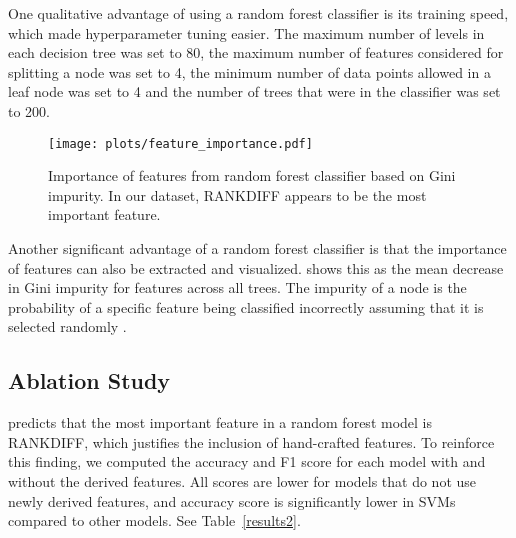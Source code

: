 
One qualitative advantage of using a random forest classifier is its training speed, which made hyperparameter tuning easier. The maximum number of levels in each decision tree was set to 80, the maximum number of features considered for splitting a node was set to 4, the minimum number of data points allowed in a leaf node was set to 4 and the number of trees that were in the classifier was set to 200.

\begin{figure}[ht]

\texttt{[image: plots/feature\_importance.pdf]}
\caption{Importance of features from random forest classifier based on Gini impurity. In our dataset, RANKDIFF appears to be the most important feature.}

\label{fig:fig4}
\centering
\end{figure}


Another significant advantage of a random forest classifier is that the importance of features can also be extracted and visualized.   shows this as the mean decrease in Gini impurity for features across all trees. The impurity of a node is the probability of a specific feature being classified incorrectly assuming that it is selected randomly \cite{cassidy2014calculating}.



\subsection{Ablation Study}

 predicts that the most important feature in a random forest model is  RANKDIFF, which justifies the inclusion of hand-crafted features. To reinforce this finding, we computed the accuracy and F1 score for each model with and without the derived features. All scores are lower for models that do not use newly derived features, and accuracy score is significantly lower in SVMs compared to other models. See Table~\ref{results2}.


